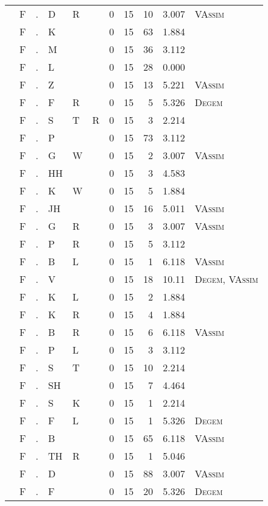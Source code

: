 \begin{longtable}{r@{ } r@{ } c@{ } l@{ } l@{ } l@{ } r r r r l }
 & F & . & D & R &  & 0 & 15 & 10 & 3.007 & \textsc{VAssim} \\
 & F & . & K &  &  & 0 & 15 & 63 & 1.884 &  \\
 & F & . & M &  &  & 0 & 15 & 36 & 3.112 &  \\
 & F & . & L &  &  & 0 & 15 & 28 & 0.000 &  \\
 & F & . & Z &  &  & 0 & 15 & 13 & 5.221 & \textsc{VAssim} \\
 & F & . & F & R &  & 0 & 15 & 5 & 5.326 & \textsc{Degem} \\
 & F & . & S & T & R & 0 & 15 & 3 & 2.214 &  \\
 & F & . & P &  &  & 0 & 15 & 73 & 3.112 &  \\
 & F & . & G & W &  & 0 & 15 & 2 & 3.007 & \textsc{VAssim} \\
 & F & . & HH &  &  & 0 & 15 & 3 & 4.583 &  \\
 & F & . & K & W &  & 0 & 15 & 5 & 1.884 &  \\
 & F & . & JH &  &  & 0 & 15 & 16 & 5.011 & \textsc{VAssim} \\
 & F & . & G & R &  & 0 & 15 & 3 & 3.007 & \textsc{VAssim} \\
 & F & . & P & R &  & 0 & 15 & 5 & 3.112 &  \\
 & F & . & B & L &  & 0 & 15 & 1 & 6.118 & \textsc{VAssim} \\
 & F & . & V &  &  & 0 & 15 & 18 & 10.11 & \textsc{Degem}, \textsc{VAssim} \\
 & F & . & K & L &  & 0 & 15 & 2 & 1.884 &  \\
 & F & . & K & R &  & 0 & 15 & 4 & 1.884 &  \\
 & F & . & B & R &  & 0 & 15 & 6 & 6.118 & \textsc{VAssim} \\
 & F & . & P & L &  & 0 & 15 & 3 & 3.112 &  \\
 & F & . & S & T &  & 0 & 15 & 10 & 2.214 &  \\
 & F & . & SH &  &  & 0 & 15 & 7 & 4.464 &  \\
 & F & . & S & K &  & 0 & 15 & 1 & 2.214 &  \\
 & F & . & F & L &  & 0 & 15 & 1 & 5.326 & \textsc{Degem} \\
 & F & . & B &  &  & 0 & 15 & 65 & 6.118 & \textsc{VAssim} \\
 & F & . & TH & R &  & 0 & 15 & 1 & 5.046 &  \\
 & F & . & D &  &  & 0 & 15 & 88 & 3.007 & \textsc{VAssim} \\
 & F & . & F &  &  & 0 & 15 & 20 & 5.326 & \textsc{Degem} \\

\end{longtable}
